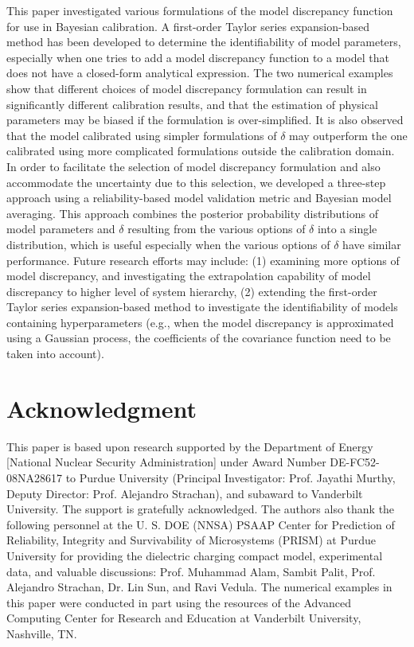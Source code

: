 \documentclass[preprint,review,12pt,3p]{elsarticle}
\begin{document}
This paper investigated various formulations of the model discrepancy function for use in Bayesian calibration. A first-order Taylor series expansion-based method has been developed to determine the identifiability of model parameters, especially when one tries to add a model discrepancy function to a model that does not have a closed-form analytical expression. The two numerical examples show that different choices of model discrepancy formulation can result in significantly different calibration results, and that the estimation of physical parameters may be biased if the formulation is over-simplified. It is also observed that the model calibrated using simpler formulations of $\delta$ may outperform the one calibrated using more complicated formulations outside the calibration domain. In order to facilitate the selection of model discrepancy formulation and also accommodate the uncertainty due to this selection, we developed a three-step approach using a reliability-based model validation metric and Bayesian model averaging. This approach combines the posterior probability distributions of model parameters and $\delta$ resulting from the various options of $\delta$ into a single distribution, which is useful especially when the various options of $\delta$ have similar performance. Future research efforts may include: (1) examining more options of model discrepancy, and investigating the extrapolation capability of model discrepancy to higher level of system
hierarchy, (2) extending the first-order Taylor series expansion-based method to investigate the identifiability of models containing hyperparameters (e.g., when the model discrepancy is approximated using a
Gaussian process, the coefficients of the covariance function need to be taken into account).



\section*{Acknowledgment}
This paper is based upon research supported by the Department of Energy [National Nuclear Security Administration] under Award Number DE-FC52-08NA28617 to Purdue University (Principal Investigator: Prof. Jayathi Murthy, Deputy Director: Prof. Alejandro Strachan), and subaward to Vanderbilt University. The support is gratefully acknowledged. The authors also thank the following personnel at the U. S. DOE (NNSA) PSAAP Center for Prediction of Reliability, Integrity and Survivability of Microsystems (PRISM) at Purdue University for providing the dielectric charging compact model, experimental data, and valuable discussions: Prof. Muhammad Alam, Sambit Palit, Prof. Alejandro Strachan, Dr. Lin Sun, and Ravi Vedula. The numerical examples in this paper were conducted in part using the resources of the Advanced Computing Center for Research and Education at Vanderbilt University, Nashville, TN.

\singlespacing


\end{document}
